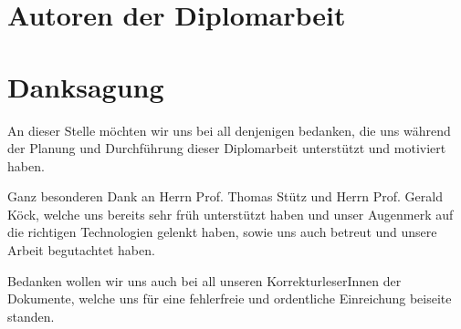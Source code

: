 \section*{Autoren der Diplomarbeit}

\section*{Danksagung}

An dieser Stelle möchten wir uns bei all denjenigen bedanken, die uns während der
Planung und Durchführung dieser Diplomarbeit unterstützt und motiviert haben.

Ganz besonderen Dank an Herrn Prof. Thomas Stütz und Herrn Prof. Gerald Köck, welche uns bereits sehr früh unterstützt haben und unser Augenmerk auf die richtigen Technologien gelenkt haben, sowie uns auch betreut und unsere Arbeit begutachtet haben.

Bedanken wollen wir uns auch bei all unseren KorrekturleserInnen der Dokumente, welche
uns für eine fehlerfreie und ordentliche Einreichung beiseite standen.
